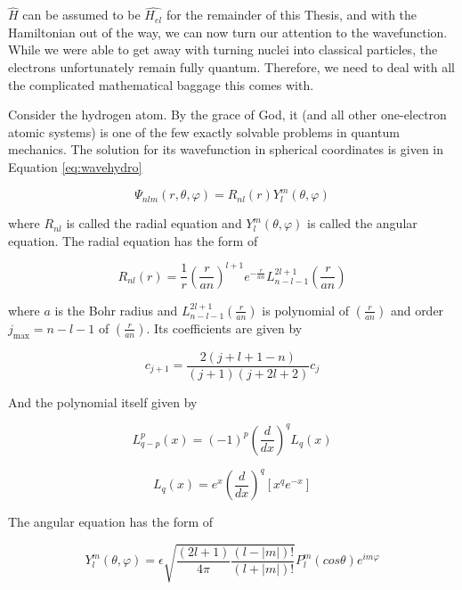 \documentclass[12pt]{report}
\begin{document}
$\hat{H}$ can be assumed to be $\hat{H_{el}}$ for the remainder of this Thesis, and with the Hamiltonian out of the way, we can now turn our attention to the wavefunction. While we were able to get away with turning nuclei into classical particles, the electrons unfortunately remain fully quantum. Therefore, we need to deal with all the complicated mathematical baggage this comes with.

Consider the hydrogen atom. By the grace of God, it (and all other one-electron atomic systems) is one of the few exactly solvable problems in quantum mechanics. The solution for its wavefunction in spherical coordinates is given in Equation \ref{eq:wavehydro}\cite{Griffiths2}

\begin{equation}
\label{eq:wavehydro}
\Psi_{nlm}(r, \theta, \varphi) = R_{nl}(r)Y^{m}_{l}(\theta,\varphi)
\end{equation} 

where $R_{nl}$ is called the radial equation and $Y^{m}_{l}(\theta,\varphi)$ is called the angular equation. The radial equation has the form of

\begin{equation}
\label{eq:wavehydro_R}
R_{nl}(r) = \frac{1}{r}\left(\frac{r}{an}\right)^{l+1}e^{-\frac{r}{an}}L^{2l+1}_{n-l-1}\left(\frac{r}{an}\right)
\end{equation} 

where $a$ is the Bohr radius and $L^{2l+1}_{n-l-1}\left(\frac{r}{an}\right)$ is polynomial of $\left(\frac{r}{an}\right)$ and order $j_{\text{max}}=n-l-1$ of $\left(\frac{r}{an}\right)$. Its coefficients are given by

\begin{equation}
\label{eq:wavehydro_R_coef}
c_{j+1} = \frac{2(j+l+1-n)}{(j+1)(j+2l+2)}c_{j}
\end{equation} 

And the polynomial itself given by

\begin{equation}
\label{eq:wavehydro_L1}
L^{p}_{q-p}(x) = (-1)^{p}\left(\frac{d}{dx}\right)^{q}L_{q}(x)
\end{equation}

\begin{equation}
\label{eq:wavehydro_L2}
L_{q}(x) = e^{x}\left(\frac{d}{dx}\right)^{q}\left[x^{q}e^{-x}\right]
\end{equation}

The angular equation has the form of 

\begin{equation}
\label{eq:wavehydro_Y1}
Y^{m}_{l}(\theta,\varphi) = \epsilon\sqrt{\frac{(2l + 1)}{4\pi}\frac{(l-|m|)!}{(l+|m|)!}}P^{m}_{l}(cos\theta)e^{im\varphi}
\end{equation}
\end{document}
